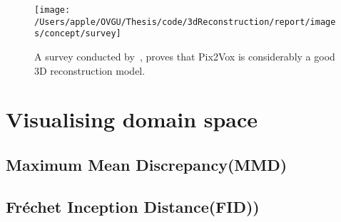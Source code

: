 \begin{figure}
    \centering
    \texttt{[image: /Users/apple/OVGU/Thesis/code/3dReconstruction/report/images/concept/survey]}
    \caption{A survey conducted by~\cite{Han2021ImageBased3O}, proves that Pix2Vox is considerably a good 3D reconstruction model.
    }
    \label{fig:survey on 3d reconstruction}
\end{figure}


\section{Visualising domain space}

\subsection{Maximum Mean Discrepancy(MMD)}
\subsection{Fr\'echet Inception Distance(FID))}

